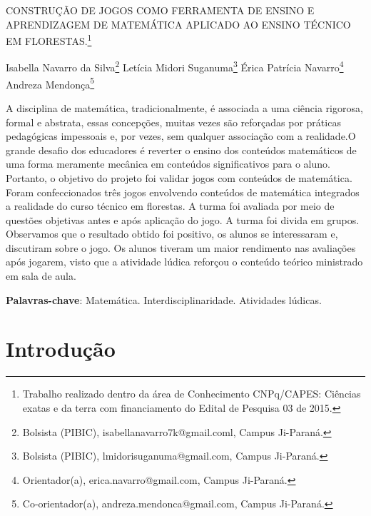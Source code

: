 \documentclass[article,12pt,onesidea,4paper,english,brazil]{abntex2}
\begin{document}
	
	
	\frenchspacing 
	
	\begin{center}
		\LARGE CONSTRUÇÃO DE JOGOS COMO FERRAMENTA DE ENSINO E APRENDIZAGEM DE MATEMÁTICA APLICADO AO ENSINO TÉCNICO EM FLORESTAS.\footnote{Trabalho realizado dentro da área de Conhecimento CNPq/CAPES: Ciências exatas e da terra com financiamento do Edital de Pesquisa 03 de 2015.}
		
		\normalsize
		Isabella Navarro da Silva\footnote{Bolsista (PIBIC), isabellanavarro7k@gmail.coml, Campus Ji-Paraná.} 
		Letícia Midori Suganuma\footnote{Bolsista (PIBIC), lmidorisuganuma@gmail.com, Campus Ji-Paraná.} 
	Érica Patrícia Navarro\footnote{Orientador(a), erica.navarro@gmail.com, Campus Ji-Paraná.} 
		Andreza Mendonça\footnote{Co-orientador(a), andreza.mendonca@gmail.com, Campus Ji-Paraná.} 
	\end{center}
	
	\begin{resumoumacoluna}
	A disciplina de matemática, tradicionalmente, é associada a uma ciência rigorosa, formal e abstrata, essas concepções, muitas vezes são reforçadas por práticas pedagógicas impessoais e, por vezes, sem qualquer associação com a realidade.O grande desafio dos educadores é reverter o ensino dos conteúdos matemáticos de uma forma meramente mecânica em conteúdos significativos para o aluno. Portanto, o objetivo do projeto foi validar jogos com conteúdos de matemática. Foram confeccionados três jogos envolvendo conteúdos de matemática integrados a realidade do curso técnico em florestas. A turma foi avaliada por meio de questões objetivas antes e após aplicação do jogo. A turma foi divida em grupos. Observamos que o resultado obtido foi positivo, os alunos se interessaram e, discutiram sobre o jogo. Os alunos tiveram um maior rendimento nas avaliações após jogarem, visto que a atividade lúdica reforçou o conteúdo teórico ministrado em sala de aula.
		
		\vspace{\onelineskip}
		
		\noindent
		\textbf{Palavras-chave}: Matemática. Interdisciplinaridade. Atividades lúdicas.
	\end{resumoumacoluna}
	
	\section*{Introdução}
	
\end{document}
